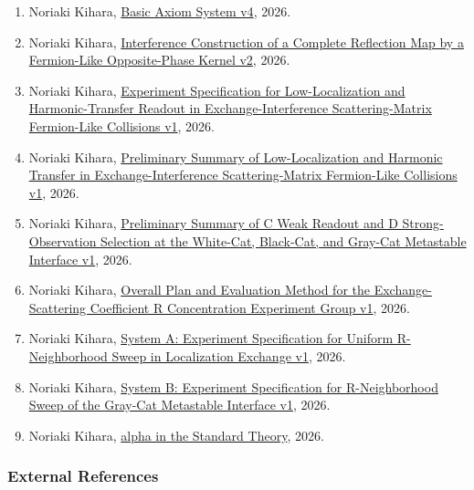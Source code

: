 \documentclass[
]{article}
\providecommand{\tightlist}{%
  \setlength{\itemsep}{0pt}\setlength{\parskip}{0pt}}
\begin{document}
\begin{enumerate}
\def\labelenumi{\arabic{enumi}.}
\tightlist
\item
  Noriaki Kihara, \href{../20260710/基本公理系\%20v4.md}{Basic Axiom
  System v4}, 2026.
\item
  Noriaki Kihara,
  \href{../20260710/フェルミオン的逆相核による完全反射写像の干渉構成\%20v2.md}{Interference
  Construction of a Complete Reflection Map by a Fermion-Like
  Opposite-Phase Kernel v2}, 2026.
\item
  Noriaki Kihara,
  \href{../20260713/交換干渉散乱行列フェルミオン的衝突における低局在性・倍音移乗読出し実験仕様書\%20v1.md}{Experiment
  Specification for Low-Localization and Harmonic-Transfer Readout in
  Exchange-Interference Scattering-Matrix Fermion-Like Collisions v1},
  2026.
\item
  Noriaki Kihara,
  \href{../20260713/交換干渉散乱行列フェルミオン的衝突における低局在性・倍音移乗予備実験総括\%20v1.md}{Preliminary
  Summary of Low-Localization and Harmonic Transfer in
  Exchange-Interference Scattering-Matrix Fermion-Like Collisions v1},
  2026.
\item
  Noriaki Kihara,
  \href{../20260714/白猫黒猫灰色猫準安定界面におけるC弱読出しとD強観測選択予備実験総括\%20v1.md}{Preliminary
  Summary of C Weak Readout and D Strong-Observation Selection at the
  White-Cat, Black-Cat, and Gray-Cat Metastable Interface v1}, 2026.
\item
  Noriaki Kihara,
  \href{交換散乱係数R集中実験群_全体計画と評価方法_v1.md}{Overall Plan
  and Evaluation Method for the Exchange-Scattering Coefficient R
  Concentration Experiment Group v1}, 2026.
\item
  Noriaki Kihara,
  \href{系統A_局在性交換R近傍斉一スイープ実験仕様書_v1.md}{System A:
  Experiment Specification for Uniform R-Neighborhood Sweep in
  Localization Exchange v1}, 2026.
\item
  Noriaki Kihara,
  \href{系統B_灰色猫準安定界面R近傍スイープ実験仕様書_v1.md}{System B:
  Experiment Specification for R-Neighborhood Sweep of the Gray-Cat
  Metastable Interface v1}, 2026.
\item
  Noriaki Kihara, \href{標準理論でのα.md}{alpha in the Standard Theory},
  2026.
\end{enumerate}

\subsubsection{External References}\label{external-references}
\end{document}
